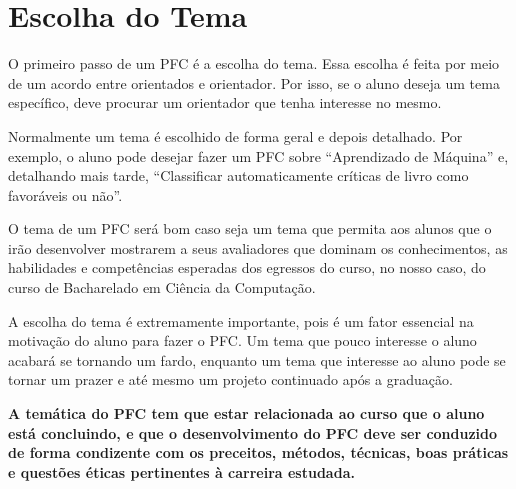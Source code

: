 
\chapter{Escolha do Tema}

O primeiro passo de um PFC é a escolha do tema. Essa escolha é feita por meio de um acordo entre orientados e orientador. Por isso, se o aluno deseja um tema específico, deve procurar um orientador que tenha interesse no mesmo.

Normalmente um tema é escolhido de forma geral e depois detalhado. Por exemplo, o aluno pode desejar fazer um PFC sobre “Aprendizado de Máquina” e, detalhando mais tarde, “Classificar automaticamente críticas de livro como favoráveis ou não”.

O tema de um PFC será bom caso seja um tema que permita aos alunos que o irão desenvolver mostrarem a seus avaliadores que dominam os conhecimentos, as habilidades e competências esperadas dos egressos do curso, no nosso caso, do curso de Bacharelado em Ciência da Computação.

A escolha do tema é extremamente importante, pois é um fator essencial na motivação do aluno para fazer o PFC. Um tema que pouco interesse o aluno acabará se tornando um fardo, enquanto um tema que interesse ao aluno pode se tornar um prazer e até mesmo um projeto continuado após a graduação.

\textbf{A temática do PFC tem que estar relacionada ao curso que o aluno está concluindo, e que o desenvolvimento do PFC deve ser conduzido de forma condizente com os preceitos, métodos, técnicas, boas práticas e questões éticas pertinentes à carreira estudada. }
